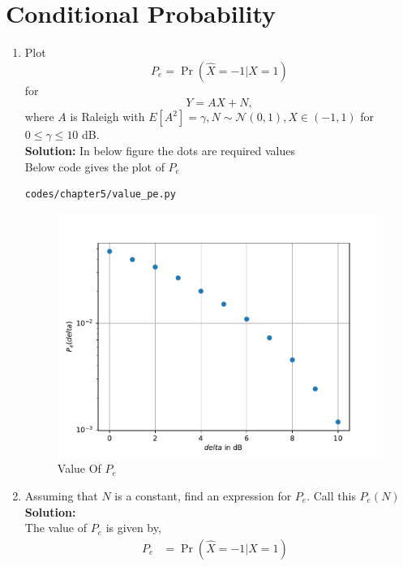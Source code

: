 \documentclass[journal,15pt,twocolumn]{IEEEtran}
\providecommand{\pr}[1]{\ensuremath{\Pr\left(#1\right)}}
\providecommand{\sbrak}[1]{\ensuremath{{}\left[#1\right]}}
\providecommand{\brak}[1]{\ensuremath{\left(#1\right)}}
\newcommand{\solution}{\noindent \textbf{Solution: }}
\providecommand{\gauss}[2]{\mathcal{N}\ensuremath{\left(#1,#2\right)}}
\begin{document}
\section{Conditional Probability}
\begin{enumerate}
\item
\label{ch4_sim}
Plot 
\begin{equation}
P_e = \pr{\hat{X} = -1|X=1}
\end{equation}
%
for 
\begin{equation}
Y = AX+N,
\end{equation}
where $A$ is Raleigh with $E\sbrak{A^2} = \gamma, N \sim \gauss{0}{1}, X \in \brak{-1,1}$ for $0 \le \gamma \le 10$ dB.\\ 
\solution In below figure the dots are required values \\
Below code gives the plot of $P_e$
\begin{lstlisting}
codes/chapter5/value_pe.py
\end{lstlisting}
\begin{figure}[H]
\centering
\includegraphics[width=\columnwidth]{./figs/chapter5/value_pe.pdf}
\caption{Value Of $P_e$ }
\end{figure}
%
\item
Assuming that $N$ is a constant, find an expression for $P_e$.  Call this $P_e(N)$\\
\solution\\
The value of $P_e$ is given by,
\begin{align}
    P_e &= \pr{\hat{X} = -1|X=1}&\\ \nonumber
\end{align}


\end{enumerate}
\end{document}
